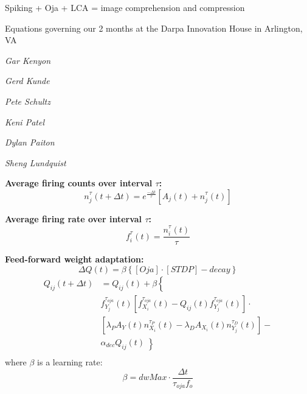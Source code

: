 \documentclass{article}
\def\nterm#1#2{n_{#1}^{\displaystyle{\tau_{#2}}}}
\def\fterm#1#2{f_{#1}^{\displaystyle{\tau_{#2}}}}
\begin{document}
\centerline{\sc \large Spiking + Oja + LCA = image comprehension and compression}
\vspace{.5pc}
\centerline{\sc Equations governing our 2 months at the Darpa Innovation House in Arlington, VA}
\begin{minipage}[t]{0.5\textwidth}
\centerline{\it Gar Kenyon}
\centerline{\it Gerd Kunde}
\centerline{\it Pete Schultz}
\end{minipage}
\begin{minipage}[t]{0.5\textwidth}
\centerline{\it Keni Patel}
\centerline{\it Dylan Paiton}
\centerline{\it Sheng Lundquist}
\end{minipage}

\vspace{1pc}

{\bf Average firing counts over interval $\tau$:}
\begin{equation}\label{avgSpikes}
\nterm{j}{}(t+\Delta t) = e^{\frac{-\Delta t}{\displaystyle{\tau}}} \left[A_{j}(t) + \nterm{j}{}(t)\right]
\end{equation}


{\bf Average firing rate over interval $\tau$:}
\begin{equation}\label{avgRate}
\fterm{i}{}(t) = \frac{\nterm{i}{}(t)}{\tau}
\end{equation}


{\bf Feed-forward weight adaptation:}
\begin{equation}\nonumber
    \Delta Q(t) = \beta \left\{[Oja] \cdot [STDP] - decay\right\}
\end{equation}
\begin{equation}\begin{split}
Q_{ij}(t+\Delta t) &= Q_{ij}(t) + \beta \left\{\right.\\[2mm]
                        &\fterm{Y_j}{oja}(t) \left[\fterm{X_i}{oja}(t) - Q_{ij}(t) \fterm{Y_j}{oja}(t)\right] \cdot\\[2mm]
                        &\left[ \lambda_{P} A_{Y}(t) \nterm{X_{i}}{P}(t) - \lambda_{D} A_{X}_{i}(t) \nterm{Y_{j}}{D}(t)\right] -\\[2mm]
                        &\alpha_{dec} Q_{ij}(t)\left\}\right.\\
\end{split}\end{equation}
where $\beta$ is a learning rate:
\begin{equation}\nonumber
\beta = dwMax \cdot \frac{\Delta t}{\tau_{oja}f_o}
\end{equation}
\end{document}
